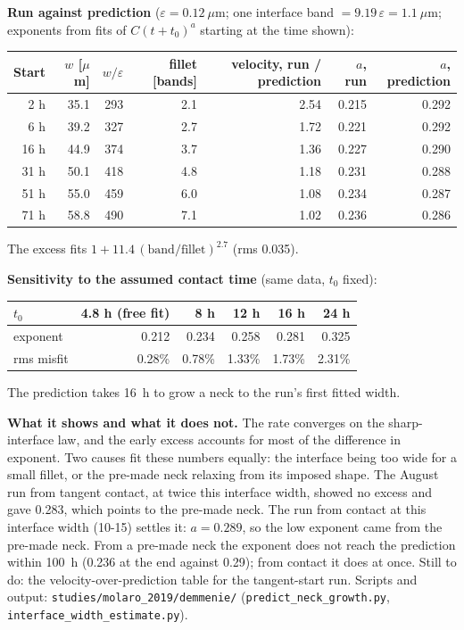 \documentclass[11pt]{article}
\begin{document}
\textbf{Run against prediction} ($\varepsilon = 0.12~\mu$m; one interface
band $= 9.19\,\varepsilon = 1.1~\mu$m; exponents from fits of
$C(t+t_0)^{a}$ starting at the time shown):
\begin{center}\small\begin{tabular}{rrrrrrr}\toprule
Start & $w$ [$\mu$m] & $w/\varepsilon$ & fillet [bands] & velocity, run / prediction & $a$, run & $a$, prediction\\\midrule
2 h & 35.1 & 293 & 2.1 & 2.54 & 0.215 & 0.292\\
6 h & 39.2 & 327 & 2.7 & 1.72 & 0.221 & 0.292\\
16 h & 44.9 & 374 & 3.7 & 1.36 & 0.227 & 0.290\\
31 h & 50.1 & 418 & 4.8 & 1.18 & 0.231 & 0.288\\
51 h & 55.0 & 459 & 6.0 & 1.08 & 0.234 & 0.287\\
71 h & 58.8 & 490 & 7.1 & 1.02 & 0.236 & 0.286\\\bottomrule
\end{tabular}\end{center}
The excess fits $1 + 11.4\,(\text{band}/\text{fillet})^{2.7}$ (rms 0.035).

\textbf{Sensitivity to the assumed contact time} (same data, $t_0$ fixed):
\begin{center}\small\begin{tabular}{lrrrrr}\toprule
$t_0$ & 4.8 h (free fit) & 8 h & 12 h & 16 h & 24 h\\\midrule
exponent & 0.212 & 0.234 & 0.258 & 0.281 & 0.325\\
rms misfit & 0.28\% & 0.78\% & 1.33\% & 1.73\% & 2.31\%\\\bottomrule
\end{tabular}\end{center}
The prediction takes 16~h to grow a neck to the run's first fitted width.

\textbf{What it shows and what it does not.} The rate converges on the
sharp-interface law, and the early excess accounts for most of the
difference in exponent. Two causes fit these numbers equally: the interface
being too wide for a small fillet, or the pre-made neck relaxing from its
imposed shape. The August run from tangent contact, at twice this interface
width, showed no excess and gave 0.283, which points to the pre-made neck.
The run from contact at this interface width (10-15) settles it:
$a = 0.289$, so the low exponent came from the pre-made neck.
From a pre-made neck the exponent does not reach the prediction within
100~h (0.236 at the end against 0.29); from contact it does at once. Still
to do: the velocity-over-prediction table for the tangent-start run. Scripts and output:
\texttt{studies/molaro\_2019/demmenie/} (\texttt{predict\_neck\_growth.py},
\texttt{interface\_width\_estimate.py}).
\end{document}
